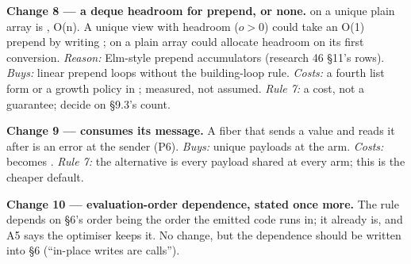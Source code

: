 \textbf{Change 8 — a deque headroom for prepend, or none.} \code{[ x, …xs ]} on a unique plain array is , O(n). A unique view with headroom ($o>0$) could take an O(1) prepend by writing ;  on a plain array could allocate headroom on its first conversion. \emph{Reason:} Elm-style prepend accumulators (research 46 §11's rows). \emph{Buys:} linear prepend loops without the building-loop rule. \emph{Costs:} a fourth list form or a growth policy in ; measured, not assumed. \emph{Rule 7:} a cost, not a guarantee; decide on §9.3's  count.

\textbf{Change 9 —  consumes its message.} A fiber that sends a value and reads it after is an error at the sender (P6). \emph{Buys:} unique payloads at the arm. \emph{Costs:}  becomes . \emph{Rule 7:} the alternative is every payload shared at every arm; this is the cheaper default.

\textbf{Change 10 — evaluation-order dependence, stated once more.} The rule depends on  §6's order being the order the emitted code runs in; it already is, and A5 says the optimiser keeps it. No change, but the dependence should be written into §6 (“in-place writes are calls”).
